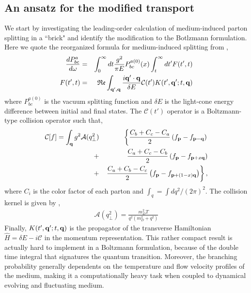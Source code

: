 \documentclass[aps, prc, reprint, amsmath, groupedaddress, nofootinbib]{revtex4-1}
\begin{document}
\subsection{An ansatz for the modified transport}
We start by investigating the leading-order calculation of medium-induced parton splitting in a ``brick" and identify the modification to the Botlzmann formulation.
Here we quote the reorganized formula for medium-induced splitting from \cite{CaronHuot:2010bp},
\begin{eqnarray}
\frac{dP^{a}_{bc}}{d\omega} &=& \int_0^\infty dt \frac{g^2}{\pi E} P_{bc}^{a(0)}(x) \int_t^\infty dt'  F(t', t)
\label{eq:full-theory}
\\
F(t', t) &=& \mathfrak{Re} \int_{{\bf q}', {\bf q}} \frac{i {\bf q}'\cdot {\bf q}}{\delta E} \mathcal{C}(t') K(t', {\bf q}'; t, {\bf q})
\end{eqnarray}
where $P_{bc}^{a(0)}$ is the vacuum splitting function and $\delta E$ is the light-cone energy difference between initial and final states. 
The $\mathcal{C}(t')$ operator is a Boltzmann-type collision operator such that,
\begin{eqnarray}
\mathcal{C}[f] = \int_{\bf q} g^2\mathcal{A}(q_\perp^2)
&&\left\{  \frac{C_b+C_c-C_a}{2}\left(f_{\bf p}-f_{{\bf p}-{\bf q}}\right) \right.\\\nonumber
 +&&    \frac{C_a+C_c-C_b}{2}\left(f_{\bf p}-f_{{\bf p}+x{\bf q}}\right) \\\nonumber
+&&  \left. \frac{C_a+C_b-C_c}{2}\left(f_{\bf p}-f_{{\bf p}+(1-x){\bf q}}\right)\right\},
\end{eqnarray}
where $C_i$ is the color factor of each parton and $\int_q = \int dq^2/(2\pi)^2$.
The collision kernel is given by \cite{Aurenche:2002pd},
\begin{eqnarray}
\mathcal{A}(q_\perp^2) = \frac{m_D^2 T}{q^2\left(m_D^2+q^2\right)}
\end{eqnarray}
Finally, $K(t', {\bf q}'; t, {\bf q})$ is the propagator of the transverse  Hamiltonian $\hat{H} = \delta E - i\mathcal{C}$ in the momentum representation.
This rather compact result is actually hard to implement in a Boltzmann formulation, because of the double time integral that signatures the quantum transition.
Moreover, the branching probability generally dependents on the temperature and flow velocity profiles of the medium, making it a computationally heavy task when coupled to dynamical evolving and fluctuating medium.
\end{document}
